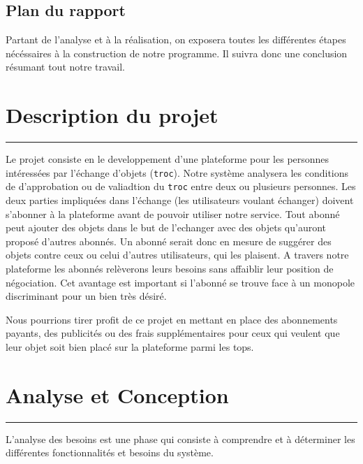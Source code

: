 \documentclass[12pt]{report}
\begin{document}
		\subsection{ \sc Plan du rapport}
		Partant de l'analyse et à la réalisation, on exposera toutes les différentes étapes nécéssaires à la construction de notre programme. Il suivra donc une conclusion résumant tout notre travail.

	\newpage
	 \section{\sc Description du projet}
	 \rule{1 \textwidth}{0.5pt} \textbf{}
	 
	 \vspace{2em}
	


	Le projet consiste en le developpement d'une plateforme pour les personnes intéressées par l'échange d'objets ({\tt troc}).	Notre système analysera les conditions de d'approbation ou de valiadtion du {\tt troc} entre deux ou plusieurs personnes.	 Les deux parties impliquées dans l'échange (les utilisateurs voulant échanger) doivent s'abonner à la plateforme avant de pouvoir utiliser notre service. Tout abonné peut ajouter des objets dans le but de l'echanger avec des objets qu'auront proposé d'autres abonnés. Un abonné serait donc en mesure de suggérer des objets contre ceux ou celui d'autres utilisateurs, qui les plaisent. A travers notre plateforme les abonnés relèverons leurs besoins sans affaiblir leur position de négociation. Cet avantage est important si l'abonné se trouve face à un monopole discriminant pour un bien très désiré.
	 
	 
	 
	  Nous pourrions tirer profit de ce projet en mettant en place des abonnements payants, des publicités ou des frais supplémentaires pour ceux qui veulent que leur objet soit bien placé sur la plateforme parmi les tops.
	

	


	\newpage
	\section{\sc Analyse et Conception}
		\rule{1 \textwidth}{0.5pt} \textbf{}
		
		\vspace{2em}
		L’analyse des besoins est une phase qui consiste à comprendre et à déterminer
		les différentes fonctionnalités et besoins du système.
\end{document}
